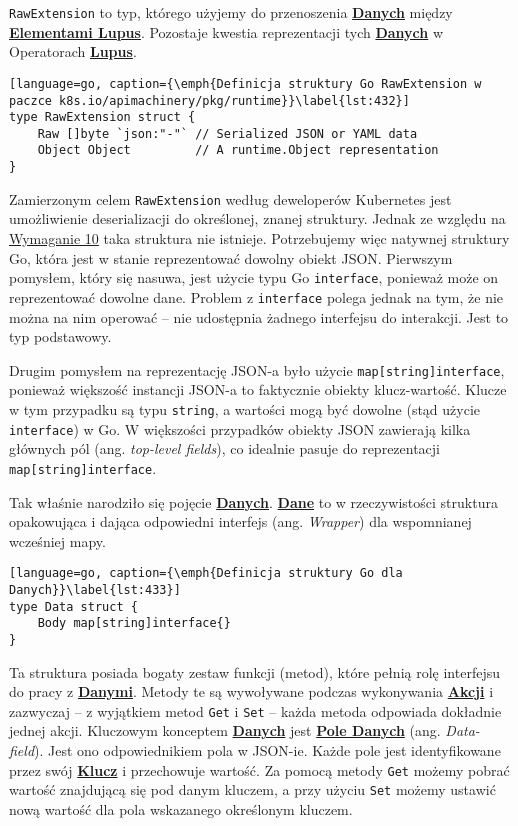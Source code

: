 \texttt{RawExtension} to typ, którego użyjemy do przenoszenia \hyperlink{def:dane}{\textbf{Danych}} między \hyperlink{def:element-lupus}{\textbf{Elementami Lupus}}. Pozostaje kwestia reprezentacji tych \hyperlink{def:dane}{\textbf{Danych}} w Operatorach \hyperlink{def:lupus}{\textbf{Lupus}}. 

\begin{lstlisting}[language=go, caption={\emph{Definicja struktury Go RawExtension w paczce k8s.io/apimachinery/pkg/runtime}}\label{lst:432}]
type RawExtension struct {
    Raw []byte `json:"-"` // Serialized JSON or YAML data
    Object Object         // A runtime.Object representation
}
\end{lstlisting}

Zamierzonym celem \texttt{RawExtension} według deweloperów Kubernetes jest umożliwienie deserializacji do określonej, znanej struktury. Jednak ze względu na \hyperref[req:10]{Wymaganie 10} taka struktura nie istnieje. Potrzebujemy więc natywnej struktury Go, która jest w stanie reprezentować dowolny obiekt JSON. Pierwszym pomysłem, który się nasuwa, jest użycie typu Go \texttt{interface{}}, ponieważ może on reprezentować dowolne dane. Problem z \texttt{interface{}} polega jednak na tym, że nie można na nim operować – nie udostępnia żadnego interfejsu do interakcji. Jest to typ podstawowy.

Drugim pomysłem na reprezentację JSON-a było użycie \texttt{map[string]interface{}}, ponieważ większość instancji JSON-a to faktycznie obiekty klucz-wartość. Klucze w tym przypadku są typu \texttt{string}, a wartości mogą być dowolne (stąd użycie \texttt{interface{}}) w Go. W większości przypadków obiekty JSON zawierają kilka głównych pól (ang. \textit{top-level fields}), co idealnie pasuje do reprezentacji \texttt{map[string]interface{}}.

Tak właśnie narodziło się pojęcie \hyperlink{def:dane}{\textbf{Danych}}. \hyperlink{def:dane}{\textbf{Dane}} to w rzeczywistości struktura opakowująca i dająca odpowiedni interfejs (ang. \textit{Wrapper}) dla wspomnianej wcześniej mapy.

\begin{lstlisting}[language=go, caption={\emph{Definicja struktury Go dla Danych}}\label{lst:433}]
type Data struct {
	Body map[string]interface{}
}
\end{lstlisting}

Ta struktura posiada bogaty zestaw funkcji (metod), które pełnią rolę interfejsu do pracy z \hyperlink{def:dane}{\textbf{Danymi}}. Metody te są wywoływane podczas wykonywania \hyperlink{def:akcja}{\textbf{Akcji}} i zazwyczaj – z wyjątkiem metod \texttt{Get} i \texttt{Set} – każda metoda odpowiada dokładnie jednej akcji. Kluczowym konceptem \hyperlink{def:dane}{\textbf{Danych}} jest \hyperlink{def:pole-danych}{\textbf{Pole Danych}} (ang. \textit{Data-field}). Jest ono odpowiednikiem pola w JSON-ie. Każde pole jest identyfikowane przez swój \hyperlink{def:klucz}{\textbf{Klucz}} i przechowuje wartość. Za pomocą metody \texttt{Get} możemy pobrać wartość znajdującą się pod danym kluczem, a przy użyciu \texttt{Set} możemy ustawić nową wartość dla pola wskazanego określonym kluczem. 

